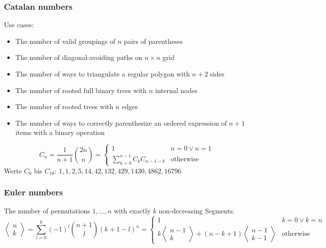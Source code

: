\subsubsection{Catalan numbers}
Use cases:
\begin{itemize}
\item The number of valid groupings of $n$ pairs of parentheses
\item The number of diagonal-avoiding paths on $n\times n$ grid
\item The number of ways to triangulate a regular polygon with $n + 2$
  sides
\item The number of rooted full binary trees with $n$ internal nodes
\item The number of rooted trees with $n$ edges
\item The number of ways to correctly parenthesize an ordered expression of $n
  + 1$ items with a binary operation
\end{itemize}
\begin{equation*}
  C_n = \frac{1}{n + 1}\binom{2n}{n} =
  \begin{cases}
    1 & n = 0 \lor n = 1\\
    \sum\limits_{k = 0}^{n - 1}C_kC_{n - 1 - k} & \text{otherwise}
  \end{cases}
\end{equation*}
Werte $C_0$ bis $C_{10}$: $1, 1, 2, 5, 14, 42, 132, 429, 1430, 4862, 16796$

\subsubsection{Euler numbers}

The number of permutations $1,\ldots, n$ with exactly $k$
non-decreasing Segments.
\begin{equation*}
  \left\langle
    \begin{matrix}
      n\\k
    \end{matrix}
\right\rangle = \sum\limits_{l = 0}^k(-1)^l \binom{n + 1}{l}(k + 1 - l)^n
  =
  \begin{cases}
    1 & k = 0 \lor k = n\\
    k \left\langle
      \begin{smallmatrix}
        n - 1\\k
      \end{smallmatrix}
\right\rangle + (n - k + 1) \left\langle
  \begin{smallmatrix}
    n - 1\\k - 1
  \end{smallmatrix}
\right\rangle & \text{otherwise}
  \end{cases}
\end{equation*}

